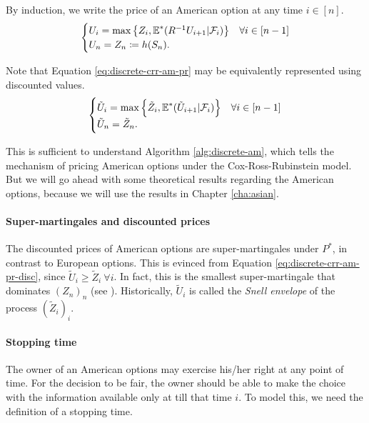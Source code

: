 By induction, we write the price of an American option at any time $ i \in [n] $.
\begin{equation}
	\label{eq:discrete-crr-am-pr}
	\begin{cases}
		U_i = \max \left\lbrace Z_i, \operatorname{\mathbb{E}}^*( R^{-1} U_{i+1} | \mathcal{F}_{i} ) \right\rbrace  &  \forall i \in [n-1]  \\
		U_n = Z_n \coloneqq h(S_n) .
	\end{cases}
\end{equation}

Note that Equation \ref{eq:discrete-crr-am-pr} may be equivalently represented using discounted values.
\begin{equation}
	\label{eq:discrete-crr-am-pr-disc}
	\begin{cases}
		\tilde{U}_i = \max \left\lbrace \tilde{Z}_i, \operatorname{\mathbb{E}}^*( \tilde{U}_{i+1} | \mathcal{F}_{i} ) \right\rbrace  &  \forall i \in [n-1]  \\
		\tilde{U}_n = \tilde{Z}_n .
	\end{cases}
\end{equation}

This is sufficient to understand Algorithm \ref{alg:discrete-am}, which tells the mechanism of pricing American options under the Cox-Ross-Rubinstein model. But we will go ahead with some theoretical results regarding the American options, because we will use the results in Chapter \ref{cha:asian}.


\paragraph{Super-martingales and discounted prices}
The discounted prices of American options are super-martingales under $ P^* $, in contrast to European options. This is evinced from Equation \ref{eq:discrete-crr-am-pr-disc}, since $ \tilde{U}_i \ge \tilde{Z}_i \  \forall i $.
In fact, this is the smallest super-martingale that dominates $ (Z_n)_n $ (see \cite[Proposition 1.3.6]{Lamberton1996}). Historically, $ \tilde{U}_i $ is called the \emph{Snell envelope} of the process $ (\tilde{Z}_i)_i $.


\paragraph{Stopping time}
The owner of an American options may exercise his/her right at any point of time. For the decision to be fair, the owner should be able to make the choice with the information available only at till that time $ i $. To model this, we need the definition of a stopping time.

